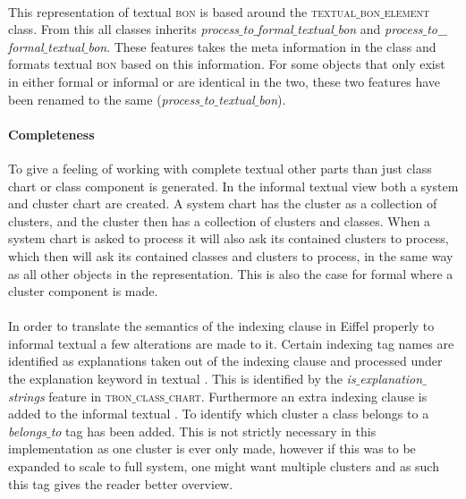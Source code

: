 \paragraph{}
This representation of textual \textsc{bon} is based around the \textsc{textual$\_$bon$\_$element} class. From this all classes inherits \textit{process$\_$to$\_$formal$\_$textual$\_$bon} and  \textit{process$\_$to$\_\newline$formal$\_$textual$\_$bon}. These features takes the meta information in the class and formats textual \textsc{bon} based on this information. For some objects that only exist in either formal or informal \bon{} or are identical in the two, these two features have been renamed to the same (\textit{process$\_$to$\_$textual$\_$bon}).

\paragraph{Completeness}
To give a feeling of working with complete textual \bon{} other parts than just class chart or class component is generated. In the informal textual \bon{} view both a system and cluster chart are created. A system chart has the cluster as a collection of clusters, and the cluster then has a collection of clusters and classes. When a system chart is asked to process it will also ask its contained clusters to process, which then will ask its contained classes and clusters to process, in the same way as all other objects in the representation. This is also the case for formal \bon{} where a cluster component is made.

\paragraph{}
In order to translate the semantics of the indexing clause in Eiffel properly to informal textual \bon{} a few alterations are made to it. Certain indexing tag names are identified as explanations taken out of the indexing clause and processed under the explanation keyword in textual \bon. This is identified by the \textit{is$\_$explanation$\_$strings} feature in \textsc{tbon$\_$class$\_$chart}. Furthermore an extra indexing clause is added to the informal textual \bon{}. To identify which cluster a class belongs to a \textit{belongs$\_$to} tag has been added. This is not strictly necessary in this implementation as one cluster is ever only made, however if this was to be expanded to scale to full system, one might want multiple clusters and as such this tag gives the reader better overview.

